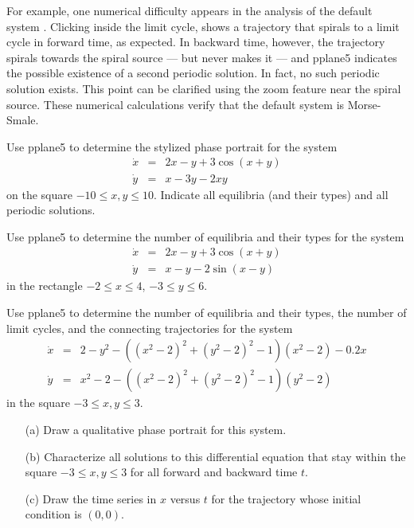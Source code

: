 \documentclass{ximera}
\begin{document}
For example, one numerical difficulty appears in the analysis of
the default system .  Clicking inside the limit
cycle, shows a trajectory that spirals to a limit cycle in
forward time, as expected. In backward time, however, the
trajectory spirals towards the spiral source --- but never makes
it --- and {\sf pplane5} indicates the possible existence of a
second periodic solution.  In fact, no such periodic solution
exists. This point can be clarified using the zoom feature near
the spiral source.  These numerical calculations verify that the 
default system  is Morse-Smale.

\EXER

\CEXER

\begin{exercise} \label{c8.4.1}
Use {\sf pplane5} to determine the stylized phase portrait for 
the system
\begin{equation*}
\begin{array}{rcl}
\dot{x} & = &  2x-y+3\cos(x+y)  \\
\dot{y} & = &  x -3y -2xy
\end{array}
\end{equation*}
on the square $-10 \leq x,y \leq 10$.  Indicate all equilibria
(and their types) and all periodic solutions.
\end{exercise}  

\begin{exercise} \label{c8.4.2}
Use {\sf pplane5} to determine the number of equilibria and their
types for the system
\begin{equation*}
\begin{array}{rcl}
\dot{x} & = &  2x-y+3\cos(x+y)  \\
\dot{y} & = &  x -y -2\sin(x-y)
\end{array}
\end{equation*}
in the rectangle $-2 \leq x \leq 4$, $-3 \leq y \leq 6$.  
\end{exercise}  

\begin{exercise} \label{c8.4.3}
Use {\sf pplane5} to determine the number of equilibria and their types, the
number of limit cycles, and the connecting trajectories for the system
\begin{equation*}
\begin{array}{rcl}
\dot{x} & = & 2-y^2-((x^2-2)^2+(y^2-2)^2-1)(x^2-2)-0.2x  \\
\dot{y} & = & x^2-2-((x^2-2)^2+(y^2-2)^2-1)(y^2-2)
\end{array}
\end{equation*}
in the square $-3 \leq x,y \leq 3$.   
\begin{itemize}
\item[(a)] Draw a qualitative phase portrait for this system.  
\item[(b)] Characterize all solutions to this differential equation that 
stay within the square $-3 \leq x,y \leq 3$ for all forward and backward time 
$t$.
\item[(c)] Draw the time series in $x$ versus $t$ for the trajectory whose
initial condition is $(0,0)$.
\end{itemize}
\end{exercise}  
\end{document}
